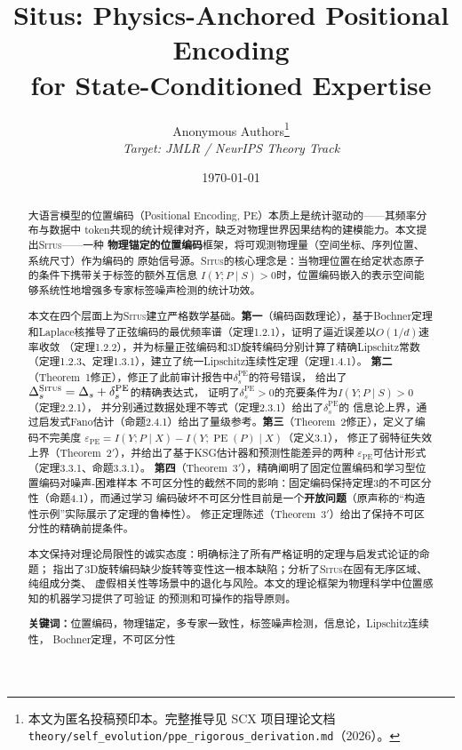 \documentclass[11pt,a4paper]{article}
\title{\textbf{\LARGE Situs: Physics-Anchored Positional Encoding\\for State-Conditioned Expertise}}
\author{%
Anonymous Authors\thanks{本文为匿名投稿预印本。完整推导见 SCX 项目理论文档
\texttt{theory/self\_evolution/ppe\_rigorous\_derivation.md}（2026）。}\\
\textit{Target: JMLR / NeurIPS Theory Track}
}
\date{\today}
\theoremstyle{remark}
\DeclareMathOperator{\PE}{PE}
\newcommand{\Situs}{\textsc{Situs}}
\begin{document}
\maketitle

\begin{abstract}
大语言模型的位置编码（Positional Encoding, PE）本质上是统计驱动的——其频率分布与数据中
token共现的统计规律对齐，缺乏对物理世界因果结构的建模能力。本文提出\Situs{}——一种
\textbf{物理锚定的位置编码}框架，将可观测物理量（空间坐标、序列位置、系统尺寸）作为编码的
原始信号源。\Situs{}的核心理念是：当物理位置在给定状态原子的条件下携带关于标签的额外互信息
$I(Y; P \mid S) > 0$时，位置编码嵌入的表示空间能够系统性地增强多专家标签噪声检测的统计功效。

本文在四个层面上为\Situs{}建立严格数学基础。\textbf{第一}（编码函数理论），基于Bochner定理
和Laplace核推导了正弦编码的最优频率谱（定理1.2.1），证明了逼近误差以$O(1/d)$速率收敛
（定理1.2.2），并为标量正弦编码和3D旋转编码分别计算了精确Lipschitz常数
（定理1.2.3、定理1.3.1），建立了统一Lipschitz连续性定理（定理1.4.1）。
\textbf{第二}（Theorem~1修正），修正了此前审计报告中$\delta_s^{\PE}$的符号错误，
给出了$\Delta_s^{\Situs} = \Delta_s + \delta_s^{\PE}$的精确表达式，
证明了$\delta_s^{\PE} > 0$的充要条件为$I(Y; P \mid S) > 0$（定理2.2.1），
并分别通过数据处理不等式（定理2.3.1）给出了$\delta_s^{\PE}$的
信息论上界，通过启发式Fano估计（命题2.4.1）给出了量级参考。\textbf{第三}（Theorem~2修正），定义了编码不完美度
$\varepsilon_{\PE} = I(Y; P \mid X) - I(Y; \PE(P) \mid X)$（定义3.1），
修正了弱特征失效上界（Theorem~$2'$），并给出了基于KSG估计器和预测性能差异的两种
$\varepsilon_{\PE}$可估计形式（定理3.3.1、命题3.3.1）。
\textbf{第四}（Theorem~$3'$），精确阐明了固定位置编码和学习型位置编码对噪声-困难样本
不可区分性的截然不同的影响：固定编码保持定理3的不可区分性（命题4.1），而通过学习
编码破坏不可区分性目前是一个\textbf{开放问题}（原声称的``构造性示例''实际展示了定理的鲁棒性）。
修正定理陈述（Theorem~$3'$）给出了保持不可区分性的精确前提条件。

本文保持对理论局限性的诚实态度：明确标注了所有严格证明的定理与启发式论证的命题；
指出了3D旋转编码缺少旋转等变性这一根本缺陷；分析了\Situs{}在固有无序区域、纯组成分类、
虚假相关性等场景中的退化与风险。本文的理论框架为物理科学中位置感知的机器学习提供了可验证
的预测和可操作的指导原则。

\textbf{关键词：}位置编码，物理锚定，多专家一致性，标签噪声检测，信息论，Lipschitz连续性，
Bochner定理，不可区分性
\end{abstract}
\end{document}
